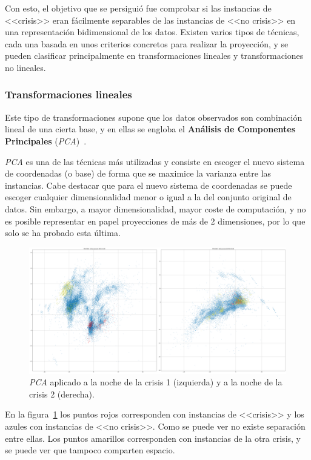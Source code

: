 Con esto, el objetivo que se persiguió fue comprobar si las instancias de <<crisis>> eran fácilmente separables de las instancias de <<no crisis>> en una representación bidimensional de los datos. Existen varios tipos de técnicas, cada una basada en unos criterios concretos para realizar la proyección, y se pueden clasificar principalmente en transformaciones lineales y transformaciones no lineales.  

\subsubsection{Transformaciones lineales}

Este tipo de transformaciones supone que los datos observados son combinación lineal de una cierta base, y en ellas se engloba el \textbf{Análisis de Componentes Principales} (\textit{PCA})~\cite{pca}. 

\textit{PCA} es una de las técnicas más utilizadas y consiste en escoger el nuevo sistema de coordenadas (o base) de forma que se maximice la varianza entre las instancias. Cabe destacar que para el nuevo sistema de coordenadas se puede escoger cualquier dimensionalidad menor o igual a la del conjunto original de datos. Sin embargo, a mayor dimensionalidad, mayor coste de computación, y no es posible representar en papel proyecciones de más de 2 dimensiones, por lo que solo se ha probado esta última. 

\begin{figure}[H]
	\centering
	\includegraphics[width=1\textwidth]{../img/pca.png}
	\caption[Ejemplo de \textit{PCA}.] {\textit{PCA} aplicado a la noche de la crisis 1 (izquierda) y a la noche de la crisis 2 (derecha).}
	\label{fig:pca}
\end{figure}

En la figura~\ref{fig:pca} los puntos rojos corresponden con instancias de <<crisis>> y los azules con instancias de <<no crisis>>. Como se puede ver no existe separación entre ellas. Los puntos amarillos corresponden con instancias de la otra crisis, y se puede ver que tampoco comparten espacio. 

